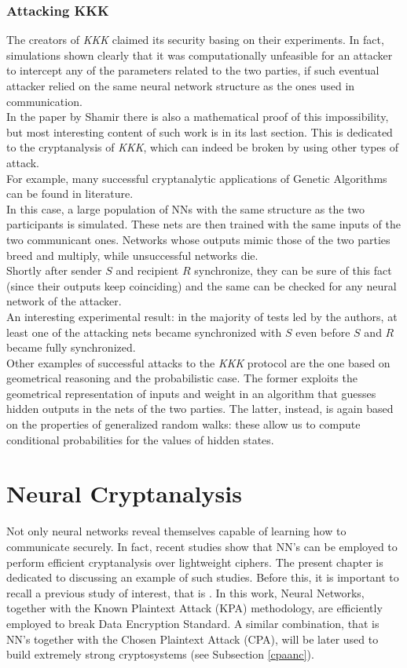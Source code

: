 \documentclass[%
    corpo=11pt,
    twoside,
    stile=classica,
    oldstyle,
    autoretitolo,
    tipotesi=magistrale,
    greek,
    evenboxes,
    english
]{toptesi}
\begin{document}
\subsection{Attacking KKK}
\label{ssc:atk}
The creators of \textit{KKK} claimed its security basing on their experiments. In fact, simulations shown clearly that it was computationally unfeasible for an attacker to intercept any of the parameters related to the two parties, if such eventual attacker relied on the same neural network structure as the ones used in communication. \\
In the paper by Shamir there is also a mathematical proof of this impossibility, but most interesting content of such work is in its last section. This is dedicated to the cryptanalysis of \textit{KKK}, which can indeed be broken by using other types of attack. \\
For example, many successful cryptanalytic applications of Genetic Algorithms can be found in literature. \\
In this case, a large population of NNs with the same structure as the two participants is simulated. These nets are then trained with the same inputs of the two communicant ones. Networks whose outputs mimic those of the two parties breed and multiply, while unsuccessful networks die. \\
Shortly after sender $S$ and recipient $R$ synchronize, they can be sure of this fact (since their outputs keep coinciding) and the same can be checked for any neural network of the attacker. \\
An interesting experimental result: in the majority of tests led by the authors, at least one  of the attacking nets became synchronized with $S$ even before $S$ and $R$ became fully synchronized. \\
Other examples of successful attacks to the \textit{KKK} protocol are the one based on geometrical reasoning and the probabilistic case. The former exploits the geometrical representation of inputs and weight in an algorithm that guesses hidden outputs in the nets of the two parties. The latter, instead, is again based on the properties of generalized random walks: these allow us to compute conditional probabilities for the values of hidden states.

\chapter{Neural Cryptanalysis}
Not only neural networks reveal themselves capable of learning how to communicate securely. In fact, recent studies show that NN's can be employed to perform efficient cryptanalysis over lightweight ciphers. The present chapter is dedicated to discussing an example of such studies. Before this, it is important to recall a previous study of interest, that is \cite{alani}. In this work, Neural Networks, together with the Known Plaintext Attack (KPA) methodology, are efficiently employed to break Data Encryption Standard. A similar combination, that is NN's together with the Chosen Plaintext Attack (CPA), will be later used to build extremely strong cryptosystems (see Subsection \ref{cpaanc}). \\
\end{document}
